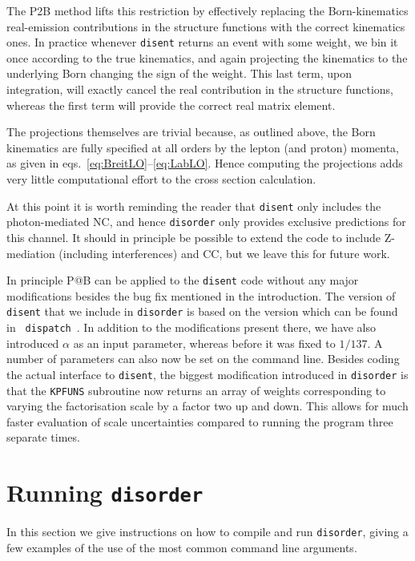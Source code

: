 \documentclass[submission, PhysCodeb]{SciPost}
\newcommand{\disent}{{\tt disent}}
\newcommand{\disorder}{{\tt disorder}}
\begin{document}
The P2B method lifts this restriction by effectively replacing the
Born-kinematics real-emission contributions in the structure functions
with the correct kinematics ones. In practice whenever \disent{}
returns an event with some weight, we bin it once according to the
true kinematics, and again projecting the kinematics to the underlying
Born changing the sign of the weight. This last term, upon integration,
will exactly cancel the real contribution in the structure functions,
whereas the first term will provide the correct real matrix element.

The projections themselves are trivial because, as outlined above, the
Born kinematics are fully specified at all orders by the lepton (and
proton) momenta, as given in
eqs.~\eqref{eq:BreitLO}--\eqref{eq:LabLO}. Hence computing the
projections adds very little computational effort to the cross section
calculation.

At this point it is worth reminding the reader that \disent{} only
includes the photon-mediated NC, and hence \disorder{} only provides
exclusive predictions for this channel. It should in principle be
possible to extend the code to include Z-mediation (including
interferences) and CC, but we leave this for future work.

In principle P@B can be applied to the \disent{} code without any
major modifications besides the bug fix mentioned in the
introduction. The version of \disent{} that we include in \disorder{}
is based on the version which can be found in {\tt
  dispatch}~\cite{Dasgupta:2002dc}. In addition to the modifications
present there, we have also introduced $\alpha$ as an input parameter,
whereas before it was fixed to $1/137$. A number of parameters can
also now be set on the command line. Besides coding the actual
interface to \disent{}, the biggest modification introduced in
\disorder{} is that the {\tt KPFUNS} subroutine now returns an array
of weights corresponding to varying the factorisation scale by a
factor two up and down. This allows for much faster evaluation of
scale uncertainties compared to running the program three separate
times.

\section{Running \disorder{}}
\label{sec:running}
In this section we give instructions on how to compile and run
\disorder{}, giving a few examples of the use of the most common
command line arguments.
\end{document}
